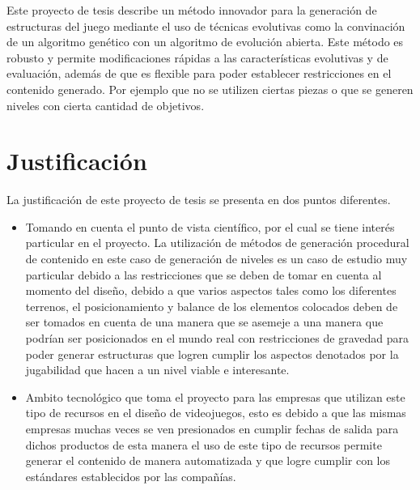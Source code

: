 Este proyecto de tesis describe un método innovador para la generación de
estructuras del juego mediante el uso de técnicas evolutivas como la convinación
de un algoritmo genético con un algoritmo de evolución abierta. Este método es
robusto y permite modificaciones rápidas a las características evolutivas y de
evaluación, además de que es flexible para poder establecer restricciones en el
contenido generado. Por ejemplo que no se utilizen ciertas piezas o que se
generen niveles con cierta cantidad de objetivos.

\section{Justificación}
\label{section:justification}

La justificación de este proyecto de tesis se presenta en dos puntos diferentes. 

\begin{itemize}
  \item Tomando en cuenta el punto de vista científico, por el cual
  se tiene interés particular en el proyecto. La utilización de métodos de
  generación procedural de contenido en este caso de generación de niveles es un
  caso de estudio muy particular debido a las restricciones que se deben de
  tomar en cuenta al momento del diseño, debido a que varios aspectos tales como
  los diferentes terrenos, el posicionamiento y balance de los elementos
  colocados deben de ser tomados en cuenta de una manera que se asemeje a una
  manera que podrían ser posicionados en el mundo real con restricciones de
  gravedad para poder generar estructuras que logren cumplir los aspectos
  denotados por la jugabilidad que hacen a un nivel viable e interesante.
  \item Ambito tecnológico que toma el proyecto para las empresas que utilizan
  este tipo de recursos en el diseño de videojuegos, esto es debido a que las
  mismas empresas muchas veces se ven presionados en cumplir fechas de salida para
  dichos productos de esta manera el uso de este tipo de recursos permite generar
  el contenido de manera automatizada y que logre cumplir con los estándares
  establecidos por las compañías.
\end{itemize}
 


